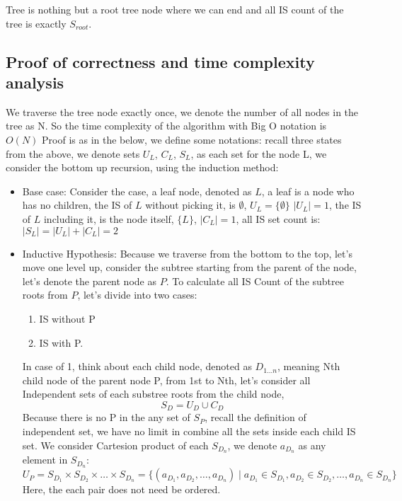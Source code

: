 \documentclass{article}
\begin{document}
Tree is nothing but a root tree node where we can end and all IS count of the tree is exactly $S_{root}$.

\subsection*{Proof of correctness and time complexity analysis}
We traverse the tree node exactly once, we denote the number of all nodes in the tree as N. So the time complexity of the algorithm with Big O notation is $O(N)$ \newline
Proof is as in the below, we define some notations: recall three states from the above, we denote sets $U_{L}$, $C_{L}$, $S_{L}$, as each set for the node L, we consider the bottom up recursion, using the induction method:
\begin{itemize}
  \item Base case: Consider the case, a leaf node, denoted as $L$, a leaf is a node who has no children, the IS of $L$ without picking it, is $\emptyset$, $U_{L} = \{\emptyset\}$ $|U_{L}|=1$, the IS of $L$ including it, is the node itself, $\{L\}$, $|C_{L}|=1$, all IS set count is: $|S_{L}| = |U_{L}| + |C_{L}| = 2$ 
  \item Inductive Hypothesis: Because we traverse from the bottom to the top, let's move one level up, consider the subtree starting from the parent of the node, let's denote the parent node as $P$. To calculate all IS Count of the subtree roots from $P$, let's divide into two cases: 
    \begin{enumerate}
      \item IS without P
      \item IS with P. 
    \end{enumerate}

    In case of 1, think about each child node, denoted as $D_{1...n}$, meaning Nth child node of the parent node P, from 1st to Nth,
    let's consider all Independent sets of each substree roots from the child node, 
    \[ S_{D} =  U_{D} \cup C_{D} \tag{$*$} \] 
    Because there is no P in the any set of $S_{P}$, recall the definition of independent set, we have no limit in combine all the sets inside each child IS set.
    We consider Cartesion product of each $S_{D_n}$, we denote $a_{D_n}$ as any element in $S_{D_n}$:
    \[ U_P =  S_{D_1} \times S_{D_2} \times \ldots \times S_{D_n} = \{(a_{D_1}, a_{D_2}, \ldots, a_{D_n}) \mid a_{D_1} \in S_{D_1}, a_{D_2} \in S_{D_2}, \ldots, a_{D_n} \in S_{D_n}\} \]
    Here, the each pair does not need be ordered.


\end{itemize}
\end{document}
